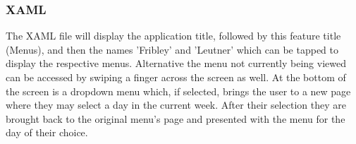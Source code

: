 \documentclass[pdftex,12pt,letter]{article}
\begin{document}
\subsubsection{XAML}
The XAML file will display the application title, followed by this feature title
(Menus), and then the names 'Fribley' and 'Leutner' which can be tapped to display the respective menus. Alternative the menu not currently being viewed can be accessed by swiping a finger across the screen as well. At the bottom of the screen is a dropdown menu which, if selected, brings the user to a new page where they may select a day in the current week. After their selection they are brought back to the original menu's page and presented with the menu for the day of their choice.
\end{document}
